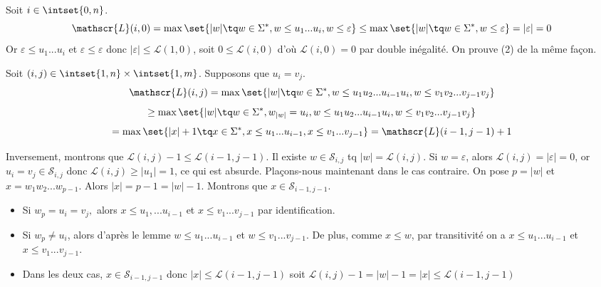 \documentclass{scrartcl}
\begin{document}
			\begin{demo}
				\item Soit $i \in \intset{0,n}$. 
				\[
					\mathscr{L}(i,0) 
					= \max\set{|w| \tq w \in \Sigma^* , w \leq u_1...u_i, w \leq \varepsilon}
					\leq \max \set{|w| \tq w \in \Sigma^*, w \leq \varepsilon}
					= |\varepsilon| = 0
				\]
				Or $\varepsilon \leq u_1...u_i$ et $\varepsilon \leq \varepsilon$ donc $|\varepsilon| \leq \mathscr{L}(1,0)$,
				soit $0 \leq \mathscr{L}(i,0)$ d'où $\mathscr{L}(i,0) = 0$ par double inégalité. On prouve (2) de la même façon.

				\item Soit $(i,j) \in \intset{1,n}\times\intset{1,m}$. Supposons que $u_i = v_j$. 
				\[
					\mathscr{L}(i,j) = 
					\max\set{|w| \tq w \in \Sigma^*, w \leq u_1u_2...u_{i-1}u_i, w \leq v_1v_2...v_{j-1}v_j}
				\]
				\[
					\geq \max\set{|w| \tq w \in \Sigma^*, w_{|w|} = u_i, w \leq u_1u_2...u_{i-1}u_i, w \leq v_1v_2...v_{j-1}v_j}
				\]
				\[
					= \max\set{|x| + 1 \tq x \in \Sigma^*, x \leq u_1...u_{i-1}, x \leq v_1...v_{j-1}}
					= \mathscr{L}(i-1,j-1) + 1
				\]
				
				Inversement, montrons que $\mathscr{L}(i,j)-1 \leq \mathscr{L}(i-1,j-1)$.
				Il existe $w \in \mathscr{S}_{i,j}$ tq $|w| = \mathscr{L}(i,j)$. 
				Si $w = \varepsilon$, alors $\mathscr{L}(i,j) = |\varepsilon| = 0$, or $u_i=v_j\in\mathscr{S}_{i,j}$ 
				donc $\mathscr{L}(i,j) \geq |u_1| = 1$, ce qui est absurde. Plaçons-nous maintenant dans le cas contraire.
				On pose $p=|w|$ et $x = w_1w_2...w_{p-1}$. Alors $|x| = p-1 = |w| - 1$.
				Montrons que $x \in \mathscr{S}_{i-1,j-1}$. 
				\begin{itemize}
					\item Si $w_p = u_i = v_j,$ alors $x \leq u_1,...u_{i-1}$ et $x \leq v_1...v_{j-1}$ par identification.
					\item Si $w_p \neq u_i$, alors d'après le lemme $w \leq u_1...u_{i-1}$ et $w \leq v_1...v_{j-1}$.
					De plus, comme $x \leq w$, par transitivité on a $x \leq u_1...u_{i-1}$ et $x \leq v_1...v_{j-1}$.
					\item Dans les deux cas, $x \in \mathscr{S}_{i-1,j-1}$ donc $|x| \leq \mathscr{L}(i-1,j-1)$ 
					soit $\mathscr{L}(i,j)-1 = |w| - 1 = |x| \leq \mathscr{L}(i-1,j-1)$
				\end{itemize}
			\end{demo}
\end{document}
